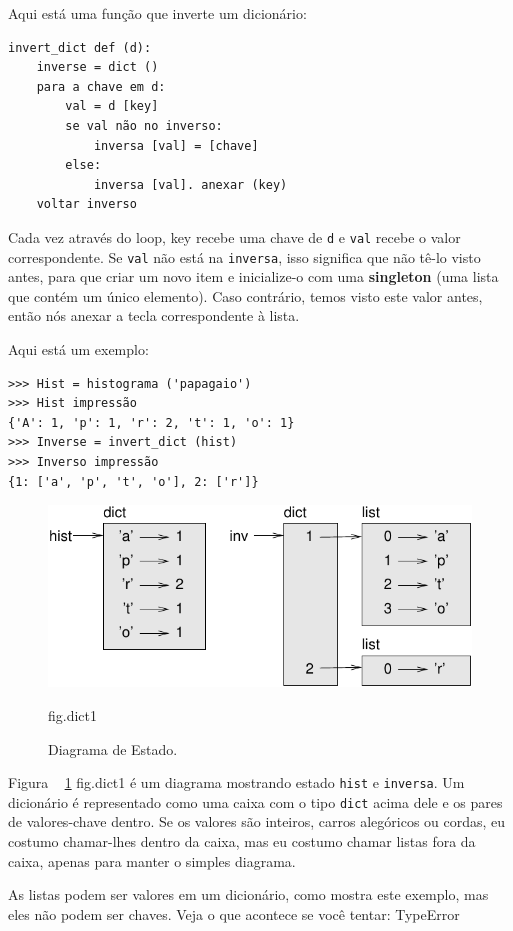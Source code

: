 \documentclass[10pt]{book}
\begin{document}
\begin{exercise}
\begin{v erbatim}
Aqui está uma função que inverte um dicionário:

\begin{verbatim}
invert_dict def (d):
    inverse = dict ()
    para a chave em d:
        val = d [key]
        se val não no inverso:
            inversa [val] = [chave]
        else:
            inversa [val]. anexar (key)
    voltar inverso
\end{verbatim}
%
Cada vez através do loop, {key \tt} recebe uma chave de {\tt d} e 
{\tt val} recebe o valor correspondente. Se {\tt val} não está na {\tt inversa},
isso significa que não tê-lo visto antes, para que criar um novo item e
inicialize-o com uma {\bf singleton} (uma lista que contém um
único elemento). Caso contrário, temos visto este valor antes, então nós
anexar a tecla correspondente à lista.

Aqui está um exemplo:

\begin{verbatim}
>>> Hist = histograma ('papagaio')
>>> Hist impressão
{'A': 1, 'p': 1, 'r': 2, 't': 1, 'o': 1}
>>> Inverse = invert_dict (hist)
>>> Inverso impressão
{1: ['a', 'p', 't', 'o'], 2: ['r']}
\end{verbatim}

\begin{figure}
\centerline
{\includegraphics[scale = 0.8] {figs/dict1.pdf}}
\caption{Diagrama de Estado.}
\label{} fig.dict1
\end{figure}

Figura ~ \ref {} fig.dict1 é um diagrama mostrando estado {\tt hist} e {\tt inversa}.
Um dicionário é representado como uma caixa com o tipo {\tt dict} acima dele
e os pares de valores-chave dentro. Se os valores são inteiros, carros alegóricos ou
cordas, eu costumo chamar-lhes dentro da caixa, mas eu costumo chamar listas
fora da caixa, apenas para manter o simples diagrama.

As listas podem ser valores em um dicionário, como mostra este exemplo, mas eles
não podem ser chaves. Veja o que acontece se você tentar:
\index{} TypeError



\end{v erbatim}
\end{exercise}
\end{document}
